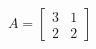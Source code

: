 \documentclass[preview]{standalone}
\begin{document}
\begin{align*}
A = \begin{bmatrix} 3 & 1 \\ 2 & 2 \end{bmatrix}
\end{align*}
\end{document}
